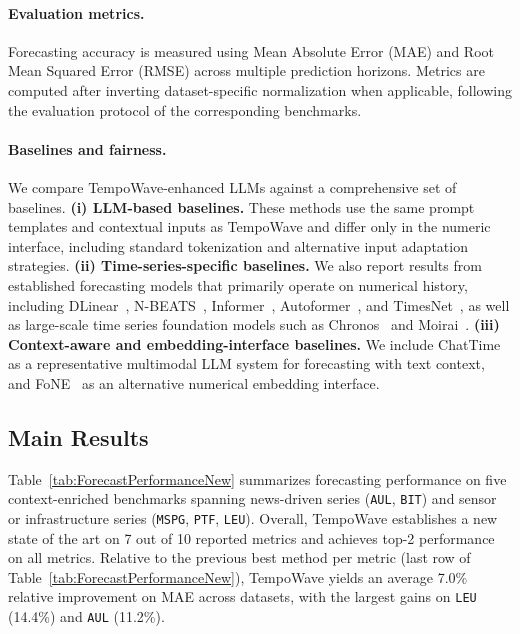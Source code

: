 \documentclass{article}
\begin{document}
\paragraph{Evaluation metrics.}
Forecasting accuracy is measured using Mean Absolute Error (MAE) and Root Mean Squared Error (RMSE) across multiple prediction horizons.
Metrics are computed after inverting dataset-specific normalization when applicable, following the evaluation protocol of the corresponding benchmarks.

\paragraph{Baselines and fairness.}
We compare TempoWave-enhanced LLMs against a comprehensive set of baselines.
\textbf{(i) LLM-based baselines.} These methods use the same prompt templates and contextual inputs as TempoWave and differ only in the numeric interface, including standard tokenization and alternative input adaptation strategies.
\textbf{(ii) Time-series-specific baselines.} We also report results from established forecasting models that primarily operate on numerical history, including DLinear~\cite{zeng2023transformers}, N-BEATS~\cite{oreshkin2020nbeats}, Informer~\cite{zhou2021informer}, Autoformer~\cite{wu2021autoformer}, and TimesNet~\cite{timesnet}, as well as large-scale time series foundation models such as Chronos~\cite{ansari2024chronos} and Moirai~\cite{woo2024moirai}.
\textbf{(iii) Context-aware and embedding-interface baselines.} We include ChatTime~\cite{liu2024chattime} as a representative multimodal LLM system for forecasting with text context, and FoNE~\cite{zhou2025fone} as an alternative numerical embedding interface.

\subsection{Main Results}
\label{sec:main_results}

Table~\ref{tab:ForecastPerformanceNew} summarizes forecasting performance on five context-enriched benchmarks spanning news-driven series (\texttt{AUL}, \texttt{BIT}) and sensor or infrastructure series (\texttt{MSPG}, \texttt{PTF}, \texttt{LEU}).
Overall, TempoWave establishes a new state of the art on {7 out of 10} reported metrics and achieves {top-2} performance on all metrics.
Relative to the previous best method per metric (last row of Table~\ref{tab:ForecastPerformanceNew}), TempoWave yields an average {7.0\%} relative improvement on MAE across datasets, with the largest gains on \texttt{LEU} ({14.4\%}) and \texttt{AUL} ({11.2\%}).
\end{document}

